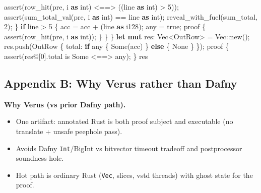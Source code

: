 \documentclass[
]{article}
\newenvironment{Shaded}{}{}
\newcommand{\ConstantTok}[1]{\textcolor[rgb]{0.53,0.00,0.00}{#1}}
\newcommand{\ControlFlowTok}[1]{\textcolor[rgb]{0.00,0.44,0.13}{\textbf{#1}}}
\newcommand{\DataTypeTok}[1]{\textcolor[rgb]{0.56,0.13,0.00}{#1}}
\newcommand{\DecValTok}[1]{\textcolor[rgb]{0.25,0.63,0.44}{#1}}
\newcommand{\KeywordTok}[1]{\textcolor[rgb]{0.00,0.44,0.13}{\textbf{#1}}}
\newcommand{\NormalTok}[1]{#1}
\newcommand{\OperatorTok}[1]{\textcolor[rgb]{0.40,0.40,0.40}{#1}}
\newcommand{\PreprocessorTok}[1]{\textcolor[rgb]{0.74,0.48,0.00}{#1}}
\providecommand{\tightlist}{%
  \setlength{\itemsep}{0pt}\setlength{\parskip}{0pt}}
\begin{document}
\begin{Shaded}
\begin{Highlighting}[]
\NormalTok{            assert(row\_hit(pre}\OperatorTok{,}\NormalTok{ i }\KeywordTok{as}\NormalTok{ int) }\OperatorTok{\textless{}==\textgreater{}}\NormalTok{ ((line }\KeywordTok{as}\NormalTok{ int) }\OperatorTok{\textgreater{}} \DecValTok{5}\NormalTok{))}\OperatorTok{;}
\NormalTok{            assert(sum\_total\_val(pre}\OperatorTok{,}\NormalTok{ i }\KeywordTok{as}\NormalTok{ int) }\OperatorTok{==}\NormalTok{ line }\KeywordTok{as}\NormalTok{ int)}\OperatorTok{;}
\NormalTok{            reveal\_with\_fuel(sum\_total}\OperatorTok{,} \DecValTok{2}\NormalTok{)}\OperatorTok{;}
        \OperatorTok{\}}
        \ControlFlowTok{if}\NormalTok{ line }\OperatorTok{\textgreater{}} \DecValTok{5} \OperatorTok{\{}
\NormalTok{            acc }\OperatorTok{=}\NormalTok{ acc }\OperatorTok{+}\NormalTok{ (line }\KeywordTok{as} \DataTypeTok{i128}\NormalTok{)}\OperatorTok{;}
\NormalTok{            any }\OperatorTok{=} \ConstantTok{true}\OperatorTok{;}
\NormalTok{            proof }\OperatorTok{\{}
\NormalTok{                assert(row\_hit(pre}\OperatorTok{,}\NormalTok{ i }\KeywordTok{as}\NormalTok{ int))}\OperatorTok{;}
            \OperatorTok{\}}
        \OperatorTok{\}}
    \OperatorTok{\}}
    \KeywordTok{let} \KeywordTok{mut}\NormalTok{ res}\OperatorTok{:} \DataTypeTok{Vec}\OperatorTok{\textless{}}\NormalTok{OutRow}\OperatorTok{\textgreater{}} \OperatorTok{=} \DataTypeTok{Vec}\PreprocessorTok{::}\NormalTok{new()}\OperatorTok{;}
\NormalTok{    res}\OperatorTok{.}\NormalTok{push(OutRow }\OperatorTok{\{}\NormalTok{ total}\OperatorTok{:} \ControlFlowTok{if}\NormalTok{ any }\OperatorTok{\{} \ConstantTok{Some}\NormalTok{(acc) }\OperatorTok{\}} \ControlFlowTok{else} \OperatorTok{\{} \ConstantTok{None} \OperatorTok{\}} \OperatorTok{\}}\NormalTok{)}\OperatorTok{;}
\NormalTok{    proof }\OperatorTok{\{}
\NormalTok{        assert(res}\OperatorTok{@}\NormalTok{[}\DecValTok{0}\NormalTok{]}\OperatorTok{.}\NormalTok{total is }\ConstantTok{Some} \OperatorTok{\textless{}==\textgreater{}}\NormalTok{ any)}\OperatorTok{;}
    \OperatorTok{\}}
\NormalTok{    res}
\end{Highlighting}
\end{Shaded}

\subsection{Appendix B: Why Verus rather than
Dafny}\label{appendix-b-why-verus-rather-than-dafny}

\textbf{Why Verus (vs prior Dafny path).}

\begin{itemize}
\tightlist
\item
  One artifact: annotated Rust is both proof subject and executable (no
  translate + unsafe peephole pass).
\item
  Avoids Dafny \texttt{Int}/BigInt vs bitvector timeout tradeoff and
  postprocessor soundness hole.
\item
  Hot path is ordinary Rust (\texttt{Vec}, slices, vstd threads) with
  ghost state for the proof.
\end{itemize}
\end{document}
